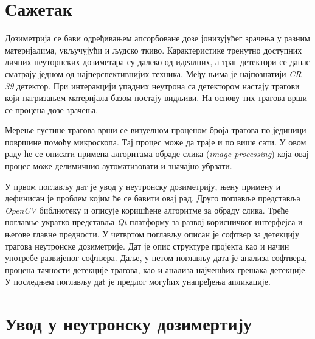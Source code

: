 \documentclass[12pt,a4paper,serbian,oneside]{book}
\begin{document}


%
%
%

\tableofcontents
\newpage

%
%
%

\chapter*{Сажетак}

Дозиметрија се бави одређивањем апсорбоване дозе јонизујућег зрачења у разним материјалима, укључујући и људско ткиво. Карактеристике тренутно доступних личних неуторнских дозиметара су далеко од идеалних, а траг детектори се данас сматрају једном од најперспективнијих техника. Међу њима је најпознатији \textit{CR-39} детектор. При интеракцији упадних неутрона са детектором настају трагови који нагризањем материјала базом постају видљиви. На основу тих трагова врши се процена дозе зрачења. 

Мерење густине трагова врши се визуелном проценом броја трагова по јединици површине помоћу микроскопа. Тај процес може да траје и по више сати. У овом раду ће се описати примена алгоритама обраде слика (\textit{image processing}) која овај процес може делимичнио аутоматизовати и значајно убрзати.

У првом поглављу дат је увод у неутронску дозиметрију, њену примену и дефинисан је проблем којим ће се бавити овај рад. Друго поглавље представља \textit{OpenCV} библиотеку и описује коришћене алгоритме за обраду слика. Треће поглавње укратко представља \textit{Qt} платформу за развој корисничког интерфејса и његове главне предности. У четвртом поглављу описан је софтвер за детекцију трагова неутронске дозиметрије. Дат је опис структуре пројекта као и начин употребе развијеног софтвера. Даље, у петом поглавњу дата је анализа софтвера, процена тачности детекције трагова, као и анализа најчешћих грешака детекције. У последњем поглављу даt је предлог могућих унапређења апликације.

%
%
%

\chapter{Увод у неутронску дозимертију}
\end{document}
